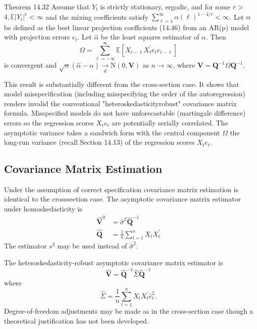 \documentclass[10pt]{article}
\begin{document}
Theorem 14.32 Assume that $Y_{t}$ is strictly stationary, ergodic, and for some $r>$ $4, \mathbb{E}\left|Y_{t}\right|^{r}<\infty$ and the mixing coefficients satisfy $\sum_{\ell=1}^{\infty} \alpha(\ell)^{1-4 / r}<\infty$. Let $\alpha$ be defined as the best linear projection coefficients (14.46) from an AR(p) model with projection errors $e_{t}$. Let $\widehat{\alpha}$ be the least squares estimator of $\alpha$. Then
$$
\Omega=\sum_{\ell=-\infty}^{\infty} \mathbb{E}\left[X_{t-\ell} X_{t}^{\prime} e_{t} e_{t-\ell}\right]
$$
is convergent and $\sqrt{n}(\widehat{\alpha}-\alpha) \underset{d}{\longrightarrow} \mathrm{N}(0, \boldsymbol{V})$ as $n \rightarrow \infty$, where $\boldsymbol{V}=\boldsymbol{Q}^{-1} \Omega \boldsymbol{Q}^{-1}$.

This result is substantially different from the cross-section case. It shows that model misspecification (including misspecifying the order of the autoregression) renders invalid the conventional "heteroskedasticityrobust" covariance matrix formula. Misspecified models do not have unforecastable (martingale difference) errors so the regression scores $X_{t} e_{t}$ are potentially serially correlated. The asymptotic variance takes a sandwich form with the central component $\Omega$ the long-run variance (recall Section 14.13) of the regression scores $X_{t} e_{t}$.

\subsection{Covariance Matrix Estimation}
Under the assumption of correct specification covariance matrix estimation is identical to the crosssection case. The asymptotic covariance matrix estimator under homoskedasticity is
$$
\begin{aligned}
\widehat{\boldsymbol{V}}^{0} &=\widehat{\sigma}^{2} \widehat{\boldsymbol{Q}}^{-1} \\
\widehat{\boldsymbol{Q}} &=\frac{1}{n} \sum_{t=1}^{n} X_{t} X_{t}^{\prime}
\end{aligned}
$$
The estimator $s^{2}$ may be used instead of $\widehat{\sigma}^{2}$.

The heteroskedasticity-robust asymptotic covariance matrix estimator is
$$
\widehat{\boldsymbol{V}}=\widehat{\boldsymbol{Q}}^{-1} \widehat{\Sigma} \widehat{\boldsymbol{Q}}^{-1}
$$
where
$$
\widehat{\Sigma}=\frac{1}{n} \sum_{t=1}^{n} X_{t} X_{t}^{\prime} \widehat{e}_{t}^{2} .
$$
Degree-of-freedom adjustments may be made as in the cross-section case though a theoretical justification has not been developed.
\end{document}

